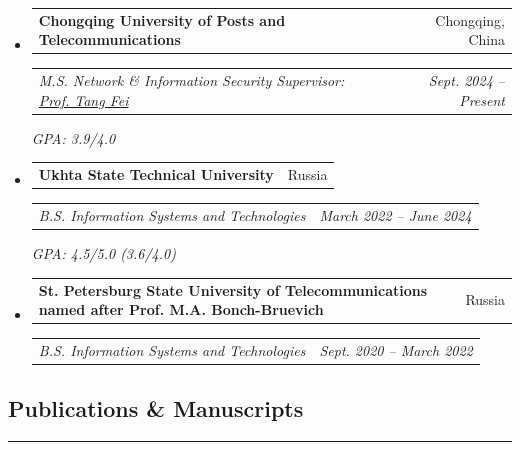 \documentclass[11pt,letterpaper]{article}
\makeatletter
\newcommand{\headerrow}[2]
{\begin{tabular*}{\linewidth}{l@{\extracolsep{\fill}}r}
#1 & #2 \\
\end{tabular*}}
\makeatother
\begin{document}
\begin{itemize}[leftmargin=1em, itemsep=0.4em]
    \parskip=0.1em

    \item
    \headerrow
        {\textbf{Chongqing University of Posts and Telecommunications}}
        {Chongqing, China}
    \headerrow
        {\emph{M.S. Network \& Information Security \quad Supervisor: \href{https://faculty.cqupt.edu.cn/tangfei/en/index.htm}{Prof. Tang Fei}}}
        {\emph{Sept. 2024 -- Present}}
        {\emph{GPA: 3.9/4.0}}

    \item
    \headerrow
        {\textbf{Ukhta State Technical University}}
        {Russia}
    \headerrow
        {\emph{B.S. Information Systems and Technologies}}
        {\emph{March 2022 -- June 2024}}
        {\emph{GPA: 4.5/5.0 (3.6/4.0)}}

    \item
    \headerrow
        {\textbf{St. Petersburg State University of Telecommunications named after Prof. M.A. Bonch-Bruevich}}
        {Russia}
    \headerrow
        {\emph{B.S. Information Systems and Technologies}}
        {\emph{Sept. 2020 -- March 2022}}

\end{itemize}

\vspace{0.2cm}

\subsection*{\Large Publications \& Manuscripts}
\vspace{-0.5em}
\hrule
\vspace{0.3em}
\end{document}
